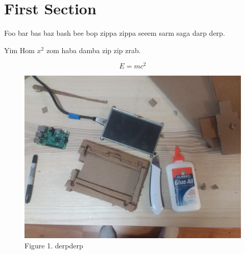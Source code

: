 \documentclass[11pt]{article}
\begin{document}
\section{
First Section}



    Foo bar bas baz bash bee bop zippa zippa seeem sarm saga darp derp.
 



    Yim Hom $x^2$ zom haba damba zip zip zrab.
    
    $$E=mc^2$$



\begin{figure}
    
\includegraphics[width=\linewidth]{../figures/x7uOC3w.jpg}

    \caption{Figure 1. derpderp}
\end{figure}
\end{document}
